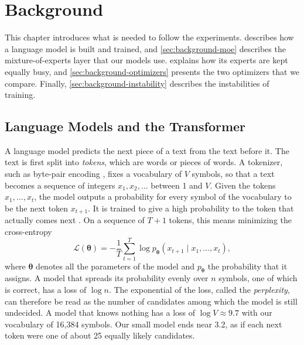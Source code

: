 \chapter{Background}
\label{sec:background}

This chapter introduces what is needed to follow the experiments.  describes how a language model is built and trained, and \cref{sec:background-moe} describes the mixture-of-experts layer that our models use.  explains how its experts are kept equally busy, and \cref{sec:background-optimizers} presents the two optimizers that we compare. Finally, \cref{sec:background-instability} describes the instabilities of training.

\section{Language Models and the Transformer}
\label{sec:background-lm}
A language model predicts the next piece of a text from the text before it. The text is first split into \emph{tokens}, which are words or pieces of words. A tokenizer, such as byte-pair encoding \cite{sennrich2016bpe}, fixes a vocabulary of $V$ symbols, so that a text becomes a sequence of integers $x_1, x_2, \dots$ between 1 and $V$. Given the tokens $x_1, \dots, x_t$, the model outputs a probability for every symbol of the vocabulary to be the next token $x_{t+1}$. It is trained to give a high probability to the token that actually comes next \cite{bengio2003neural, radford2019language}. On a sequence of $T + 1$ tokens, this means minimizing the cross-entropy
\begin{equation}[eq:background-lm-loss]{}
  \mathcal{L}(\boldsymbol{\theta}) = -\frac{1}{T} \sum_{t=1}^{T} \log p_{\boldsymbol{\theta}}(x_{t+1} \mid x_1, \dots, x_t),
\end{equation}
where $\boldsymbol{\theta}$ denotes all the parameters of the model and $p_{\boldsymbol{\theta}}$ the probability that it assigns. A model that spreads its probability evenly over $n$ symbols, one of which is correct, has a loss of $\log n$. The exponential of the loss, called the \emph{perplexity}, can therefore be read as the number of candidates among which the model is still undecided. A model that knows nothing has a loss of $\log V \approx 9.7$ with our vocabulary of 16,384 symbols. Our small model ends near 3.2, as if each next token were one of about 25 equally likely candidates.


